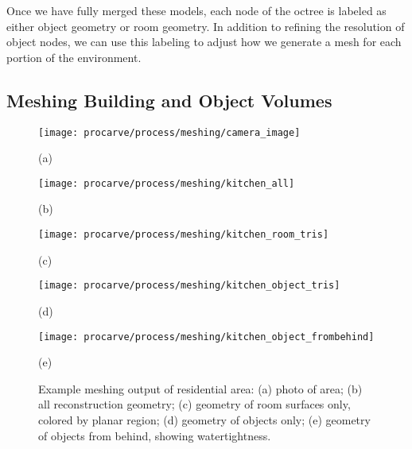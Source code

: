\documentclass[12pt,onecolumn,oneside]{book}
\begin{document}

Once we have fully merged these models, each node of the octree is labeled as either object geometry or room geometry.  In addition to refining the resolution of object nodes, we can use this labeling to adjust how we generate a mesh for each portion of the environment.  

\subsection{Meshing Building and Object Volumes}
\label{ssec:procarve_meshing}

\begin{figure}[p]

	\centering

	\begin{minipage}[t]{0.3\linewidth}
		\centerline{\texttt{[image: procarve/process/meshing/camera\_image]}}
		\centerline{(a)}
	\end{minipage}
	
	\hfill
	\begin{minipage}[t]{0.4\linewidth}
		\centerline{\texttt{[image: procarve/process/meshing/kitchen\_all]}}
		\centerline{(b)}
	\end{minipage}
	\hfill
	\begin{minipage}[t]{0.4\linewidth}
		\centerline{\texttt{[image: procarve/process/meshing/kitchen\_room\_tris]}}
		\centerline{(c)}
	\end{minipage}
	\hfill
	
	\centering
	\hfill
	\begin{minipage}[t]{0.37\linewidth}
		\centerline{\texttt{[image: procarve/process/meshing/kitchen\_object\_tris]}}
		\centerline{(d)}
	\end{minipage}
	\hfill
	\begin{minipage}[t]{0.37\linewidth}
		\centerline{\texttt{[image: procarve/process/meshing/kitchen\_object\_frombehind]}}
		\centerline{(e)}
	\end{minipage}
	\hfill	

	\caption[Example meshing output of residential area.]{Example meshing output of residential area: (a) photo of area; (b) all reconstruction geometry; (c) geometry of room surfaces only, colored by planar region; (d) geometry of objects only; (e) geometry of objects from behind, showing watertightness.}
	\label{fig:procarve_kitchen}
\end{figure}
\end{document}

